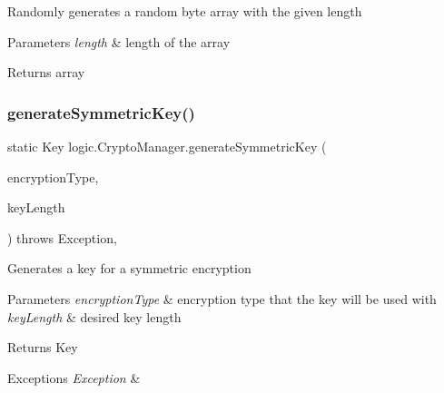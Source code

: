 Randomly generates a random byte array with the given length 
\begin{DoxyParams}{Parameters}
{\em length} & length of the array \\
\hline
\end{DoxyParams}
\begin{DoxyReturn}{Returns}
array 
\end{DoxyReturn}
\mbox{\label{classlogic_1_1_crypto_manager_ae9e89bef6dad93ba25682d76017437bf}} 
\subsubsection{\texorpdfstring{generate\+Symmetric\+Key()}{generateSymmetricKey()}}
{\footnotesize\ttfamily static Key logic.\+Crypto\+Manager.\+generate\+Symmetric\+Key (\begin{DoxyParamCaption}\item[{\mbox{\hyperlink{enumenums_1_1_encryption_type}{Encryption\+Type}}}]{encryption\+Type,  }\item[{\mbox{\hyperlink{enumenums_1_1_key_length}{Key\+Length}}}]{key\+Length }\end{DoxyParamCaption}) throws Exception\hspace{0.3cm}{\ttfamily [static]}, {\ttfamily [private]}}

Generates a key for a symmetric encryption 
\begin{DoxyParams}{Parameters}
{\em encryption\+Type} & encryption type that the key will be used with \\
\hline
{\em key\+Length} & desired key length \\
\hline
\end{DoxyParams}
\begin{DoxyReturn}{Returns}
Key 
\end{DoxyReturn}

\begin{DoxyExceptions}{Exceptions}
{\em Exception} & \\
\hline
\end{DoxyExceptions}
\mbox{\label{classlogic_1_1_crypto_manager_a2d1e7744033690a5eaaeed1e5a127485}} 
